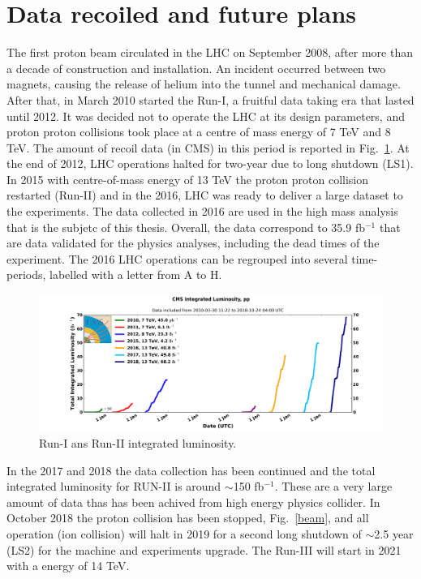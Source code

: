 \section{Data recoiled and future plans}
The first proton beam circulated in the LHC on September 2008, after more than a decade of construction and installation.
An incident occurred between two magnets, causing the release of helium into the tunnel
and mechanical damage. After that, in March  2010 started the Run-I, a fruitful data taking era that lasted until
2012.  It was decided not to operate the LHC at its design parameters, and proton proton collisions
took place at a centre of mass energy of 7 TeV and 8 TeV. The amount of recoil data (in CMS) in this period is reported in Fig.~\ref{int_lumi_cumulative_pp_1}.
At the end of 2012, LHC operations halted for two-year due to long shutdown (LS1).
In 2015 with centre-of-mass energy of 13 TeV the proton proton collision restarted (Run-II) and in the 2016,  LHC was ready to deliver a large dataset to the experiments.
The data collected in 2016 are used in the high mass analysis that is the subjetc of this thesis. Overall, the data correspond to 35.9 fb$^{-1}$ that are data validated for the physics analyses, including the  dead times of the experiment. The 2016 LHC operations can be regrouped into several time-periods, 
labelled with a letter from A to H.
\begin{figure}
\centering
\includegraphics[scale= 0.4]{../Cap2/int_lumi_cumulative_pp_1}
\caption{Run-I ans Run-II integrated luminosity.}
\label{int_lumi_cumulative_pp_1}
\end{figure}
In the 2017 and 2018 the data collection has been continued and the total integrated luminosity for RUN-II is around $\sim$150 fb$^{-1}$. 
These are a very large amount of data thas has been achived from high energy physics collider.
In October 2018 the proton collision has been stopped, Fig.~\ref{beam}, and all operation (ion collision) will  halt in 2019 for a second long shutdown of $\sim$2.5 year (LS2) for the machine and experiments upgrade. The Run-III will start in 2021 with a energy of 14 TeV.
